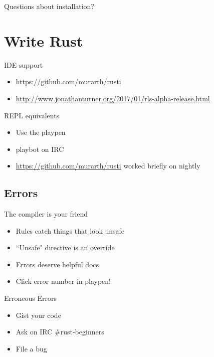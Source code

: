 \documentclass[50pt]{beamer}
\begin{document}
\begin{frame}
    Questions about installation?
\end{frame}


\section{Write Rust}

\begin{frame}
    IDE support
    \begin{itemize}
        \item \url{https://github.com/murarth/rusti}
        \item \url{http://www.jonathanturner.org/2017/01/rls-alpha-release.html}
    \end{itemize}
\end{frame}

\begin{frame}
    REPL equivalents
    \begin{itemize}
        \item Use the playpen
        \item playbot on IRC
        \item \url{https://github.com/murarth/rusti} worked briefly on nightly
    \end{itemize}
\end{frame}


\subsection{Errors}

\begin{frame}
    The compiler is your friend
    \begin{itemize}
        \item Rules catch things that look unsafe
        \item ``Unsafe" directive is an override
        \item Errors deserve helpful docs
        \item Click error number in playpen!
    \end{itemize}
\end{frame}

\begin{frame}
    Erroneous Errors
    \begin{itemize}
        \item Gist your code
        \item Ask on IRC \#rust-beginners
        \item File a bug
    \end{itemize}
\end{frame}
\end{document}
